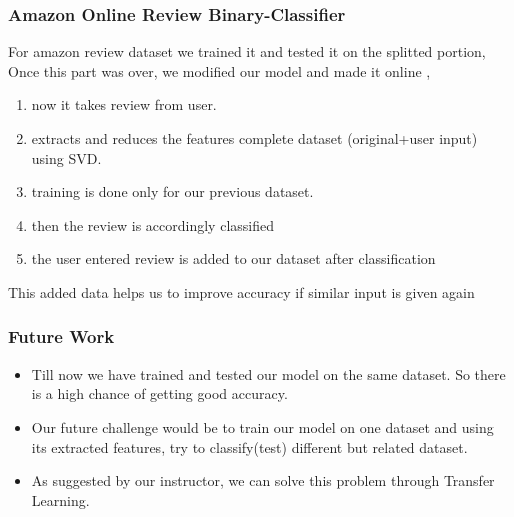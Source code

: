 \documentclass{beamer}
\newcommand\tab[1][1cm]{\hspace*{#1}}
\begin{document}
\begin{frame}
\frametitle{\quad \huge Amazon Online Review Binary-Classifier}

For amazon review dataset we trained it and tested it on the splitted portion,\\
Once this part was over, we modified our model and made it online , \linebreak \linebreak
\begin{enumerate}
\item now it takes review from user.\\
\item extracts and reduces the features complete dataset (original+user input) using SVD.\\
\item training is done only for our previous dataset. \\
\item then the review is accordingly classified \\
\item the user entered review is added to our dataset after classification \linebreak \linebreak
\end{enumerate}
This added data helps us to improve accuracy if similar input is given again

\end{frame}

\begin{frame}
\frametitle{\tab \tab \tab \tab \huge Future Work}
\begin{itemize}
\item Till now we have trained and tested our model on the same dataset. So there is a high chance of getting good accuracy. \linebreak
\item Our future challenge would be to train our model on one dataset and using its extracted features, try to classify(test) different but related dataset. \linebreak
\item As suggested by our instructor, we can solve this problem through Transfer Learning.
\end{itemize}
\end {frame}
\end{document}
